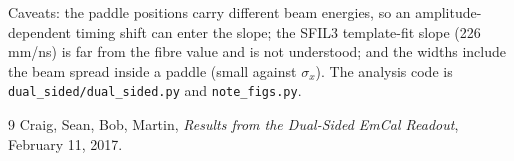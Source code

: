 \documentclass[11pt]{article}
\begin{document}
Caveats: the paddle positions carry different beam energies, so an amplitude-dependent timing shift can enter the
slope; the SFIL3 template-fit slope (226\,mm/ns) is far from the fibre value and is not understood; and the widths
include the beam spread inside a paddle (small against $\sigma_x$). The analysis code is
\texttt{dual\_sided/dual\_sided.py} and \texttt{note\_figs.py}.

\begin{thebibliography}{9}
 Craig, Sean, Bob, Martin, \emph{Results from the Dual-Sided EmCal Readout}, February 11, 2017.
\end{thebibliography}
\end{document}
